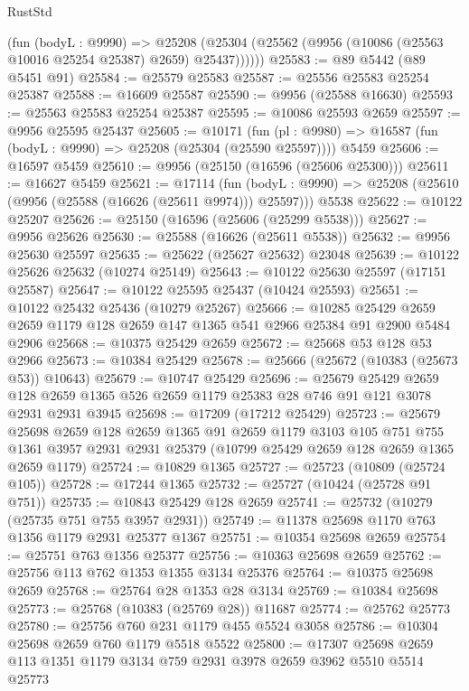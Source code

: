 \begin{lexlean}{RustStd}
\begin{coremodule}
        (fun (bodyL : @9990) =>
        @25208 (@25304 (@25562 (@9956 (@10086 (@25563 @10016 @25254 @25387) @2659) @25437))))))
@25583 := @89 @5442 (@89 @5451 @91)
@25584 := @25579 @25583
@25587 := @25556 @25583 @25254 @25387
@25588 := @16609 @25587
@25590 := @9956 (@25588 @16630)
@25593 := @25563 @25583 @25254 @25387
@25595 := @10086 @25593 @2659
@25597 := @9956 @25595 @25437
@25605 := @10171
    (fun (pl : @9980) => @16587 (fun (bodyL : @9990) => @25208 (@25304 (@25590 @25597))))
    @5459
@25606 := @16597 @5459
@25610 := @9956 (@25150 (@16596 (@25606 @25300)))
@25611 := @16627 @5459
@25621 := @17114
    (fun (bodyL : @9990) => @25208 (@25610 (@9956 (@25588 (@16626 (@25611 @9974))) @25597)))
    @5538
@25622 := @10122 @25207
@25626 := @25150 (@16596 (@25606 (@25299 @5538)))
@25627 := @9956 @25626
@25630 := @25588 (@16626 (@25611 @5538))
@25632 := @9956 @25630 @25597
@25635 := @25622 (@25627 @25632) @23048
@25639 := @10122 @25626 @25632 (@10274 @25149)
@25643 := @10122 @25630 @25597 (@17151 @25587)
@25647 := @10122 @25595 @25437 (@10424 @25593)
@25651 := @10122 @25432 @25436 (@10279 @25267)
@25666 := @10285
    @25429
    @2659
    @2659
    @1179
    @128
    @2659
    @147
    @1365
    @541
    @2966
    @25384
    @91
    @2900
    @5484
    @2906
@25668 := @10375 @25429 @2659
@25672 := @25668 @53 @128 @53 @2966
@25673 := @10384 @25429
@25678 := @25666 (@25672 (@10383 (@25673 @53)) @10643)
@25679 := @10747 @25429
@25696 := @25679
    @25429
    @2659
    @128
    @2659
    @1365
    @526
    @2659
    @1179
    @25383
    @28
    @746
    @91
    @121
    @3078
    @2931
    @2931
    @3945
@25698 := @17209 (@17212 @25429)
@25723 := @25679
    @25698
    @2659
    @128
    @2659
    @1365
    @91
    @2659
    @1179
    @3103
    @105
    @751
    @755
    @1361
    @3957
    @2931
    @2931
    @25379
    (@10799 @25429 @2659 @128 @2659 @1365 @2659 @1179)
@25724 := @10829 @1365
@25727 := @25723 (@10809 (@25724 @105))
@25728 := @17244 @1365
@25732 := @25727 (@10424 (@25728 @91 @751))
@25735 := @10843 @25429 @128 @2659
@25741 := @25732 (@10279 (@25735 @751 @755 @3957 @2931))
@25749 := @11378 @25698 @1170 @763 @1356 @1179 @2931 @25377 @1367
@25751 := @10354 @25698 @2659
@25754 := @25751 @763 @1356 @25377
@25756 := @10363 @25698 @2659
@25762 := @25756 @113 @762 @1353 @1355 @3134 @25376
@25764 := @10375 @25698 @2659
@25768 := @25764 @28 @1353 @28 @3134
@25769 := @10384 @25698
@25773 := @25768 (@10383 (@25769 @28)) @11687
@25774 := @25762 @25773
@25780 := @25756 @760 @231 @1179 @455 @5524 @3058
@25786 := @10304 @25698 @2659 @760 @1179 @5518 @5522
@25800 := @17307 @25698 @2659 @113 @1351 @1179 @3134 @759 @2931 @3978 @2659 @3962 @5510 @5514 @25773

\end{coremodule}
\end{lexlean}
